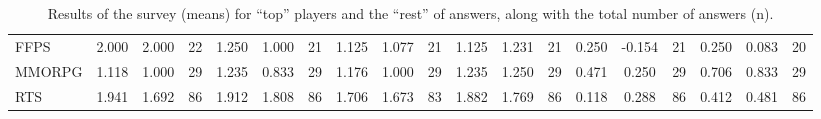\begin{table}
\begin{tabular}{|l|ccc|ccc|ccc|ccc|ccc|ccc|}
FFPS & 2.000 & 2.000 & 22 & 1.250 & 1.000 & 21 & 1.125 & 1.077 & 21 & 1.125 & 1.231 & 21 & 0.250 & -0.154 & 21 & 0.250 & 0.083 & 20 \\
MMORPG & 1.118 & 1.000 & 29 & 1.235 & 0.833 & 29 & 1.176 & 1.000 & 29 & 1.235 & 1.250 & 29 & 0.471 & 0.250 & 29 & 0.706 & 0.833 & 29 \\
RTS & 1.941 & 1.692 & 86 & 1.912 & 1.808 & 86 & 1.706 & 1.673 & 83 & 1.882 & 1.769 & 86 & 0.118 & 0.288 & 86 & 0.412 & 0.481 & 86 \\
\hline
\end{tabular}
\label{fullsurveygamers}
\caption{Results of the survey (means) for ``top'' players and the ``rest'' of answers, along with the total number of answers (n).}
\end{table}

%
%

 

